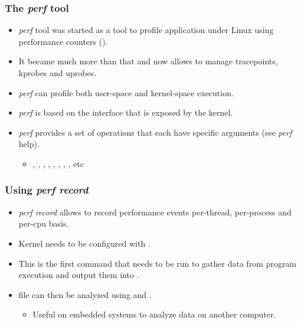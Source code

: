 \begin{frame}[fragile]
  \frametitle{The {\em perf} tool}
  \begin{itemize}
    \item {\em perf} tool was started as a tool to profile application under
          Linux using performance counters ().
    \item It became much more than that and now allows to manage tracepoints,
          kprobes and uprobes.
    \item {\em perf} can profile both user-space and kernel-space execution.
    \item {\em perf} is based on the  interface that is
          exposed by the kernel.
    \item {\em perf} provides a set of operations that each have specific
          arguments (see {\em perf} help).
    \begin{itemize}
      \item {}, , , , , , , , etc
    \end{itemize}
  \end{itemize}
\end{frame}

\begin{frame}[fragile]
  \frametitle{Using {\em perf record}}
  \begin{itemize}
    \item {\em perf record} allows to record performance events per-thread,
          per-process and per-cpu basis.
    \item Kernel needs to be configured with .
    \item This is the first command that needs to be run to gather data from
          program execution and output them into .
    \item {} file can then be analyzed using 
          and .
    \begin{itemize}
      \item Useful on embedded systems to analyze data on another computer.
    \end{itemize}
  \end{itemize}
\end{frame}

